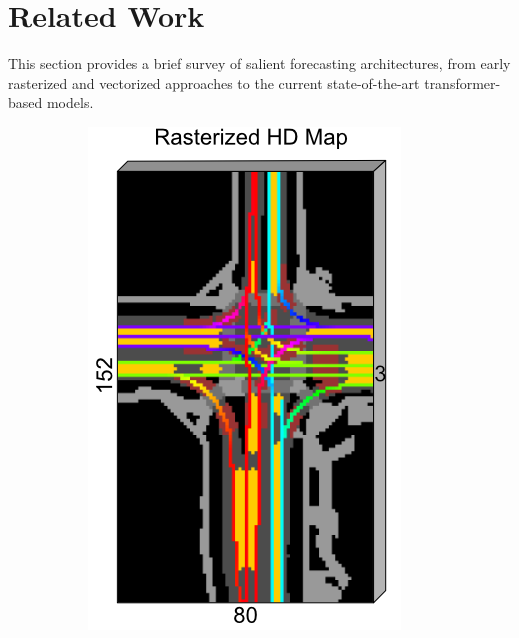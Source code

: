 \section{Related Work}
\label{sec:background}

This section provides a brief survey of salient forecasting architectures, from early rasterized and vectorized approaches to the current state-of-the-art transformer-based models.

\begin{figure}[H]
\centering
\begin{subfigure}[t]{0.35\textwidth}
    \centering
    \includegraphics[width=\textwidth]{figures/caspnet-bev-repr.png}

\end{subfigure}
\end{figure}
